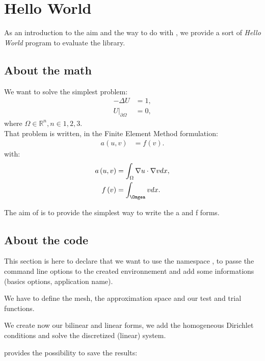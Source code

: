 \section{\feel Hello World}
As an introduction to the aim and the way to do with \feel, we provide a sort of \textit{Hello World} program to evaluate the library.

\subsection{About the math}
We want to solve the simplest problem:
\begin{equation}\nonumber
  \begin{aligned}
    - \Delta U &= 1,\\
    U|_{\partial \Omega} &= 0,
  \end{aligned}
\end{equation}
where $\Omega \in \mathbb{R}^n, n\in{1,2,3}$.\\

That problem is written, in the Finite Element Method formulation:
\begin{equation}\nonumber
  \begin{aligned}
    a\left( u,v \right)&=f(v).
  \end{aligned}
\end{equation}
with:
\begin{equation}\nonumber
  \begin{aligned}
    a\left( u,v \right)&=\int_{\Omega} \nabla u \cdot \nabla v dx,\\
    f\left( v \right) &= \int_{\Omgea} v dx.
  \end{aligned}
\end{equation}

The aim of \feel is to provide the simplest way to write the a and f forms.

\subsection{About the code}
This section is here to declare that we want to use the namespace \feel, to passe the command line options to the created environnement and add some informations (basics \feel options, application name).

We have to define the mesh, the approximation space and our test and trial functions.

We create now our bilinear and linear forms, we add the homogeneous Dirichlet conditions and solve the discretized (linear) system.

\feel provides the possibility to save the results:



